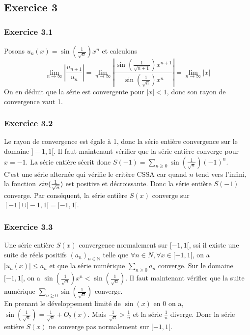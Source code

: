 \documentclass[]{book}
\theoremstyle{definition}
\newcommand{\bb}[1]{\mathbb{#1}}
\newcommand{\N}{\bb{N}}
\begin{document}
\subsection*{Exercice 3}
\subsubsection*{Exercice 3.1}
Posons $u_n(x) = \sin(\frac{1}{\sqrt{n}})x^n$ et calculons
$$
\lim_{n \to \infty} \left\lvert \frac{u_{n+1}}{u_n} \right\rvert =  \lim_{n \to \infty} \left\lvert \frac{\sin(\frac{1}{\sqrt{n+1}})x^{n+1}}{\sin(\frac{1}{\sqrt{n}})x^n} \right\rvert = \lim_{n \to \infty} \lvert x \rvert
$$
On en d\'eduit que la s\'erie est convergente pour $\lvert x \rvert < 1$, donc son rayon de convergence vaut 1.

\subsubsection*{Exercice 3.2}
Le rayon de convergence est \'egale \`a 1, donc la s\'erie enti\`ere convergence sur le domaine $]-1, 1[$. Il faut maintenant v\'erifier que la s\'erie enti\`ere converge pour $x = -1$. La s\'erie enti\`ere s\'ecrit donc $S(-1) = \sum_{n \ge 0} \sin(\frac{1}{\sqrt{n}})(-1)^n$.\\
C'est une s\'erie altern\'ee qui v\'erifie le crit\`ere CSSA car quand $n$ tend vers l'infini, la fonction $\\sin(\frac{1}{\sqrt{n}})$ est positive et d\'ecroissante. Donc la s\'erie enti\`ere $S(-1)$ converge. Par cons\'equent, la s\'erie enti\`ere $S(x)$ converge sur $[-1] \cup ]-1, 1[ = [-1, 1[$.

\subsubsection*{Exercice 3.3}
Une s\'erie enti\`ere $S(x)$ convergence normalement sur $[-1,1[$, ssi il existe une suite de r\'eels positifs 	$(a_n)_{n \in \N}$ telle que $\forall n \in N, \forall x \in [-1,1[$, on a $\lvert u_n(x) \rvert 	\le a_n$ et que la s\'erie num\'erique $\sum_{n \ge 0}a_n$ converge. Sur le domaine $[-1,1[$, on a $\sin(\frac{1}{\sqrt{n}})x^n < \sin(\frac{1}{\sqrt{n}})$. Il faut maintenant v\'erifier que la suite num\'erique $\sum_{n \ge 0}{\sin(\frac{1}{\sqrt{n}})}$ converge. \\
En prenant le d\'eveloppement limit\'e de $\sin(x)$ en 0 on a, $\sin(\frac{1}{\sqrt{n}}) = \frac{1}{\sqrt{n}} + O_2(x)$. Mais $\frac{1}{\sqrt{n}} > \frac{1}{n}$ et la s\'erie $\frac{1}{n}$ diverge. Donc la s\'erie enti\`ere $S(x)$ ne converge pas normalement sur $[-1,1[$.
\end{document}
